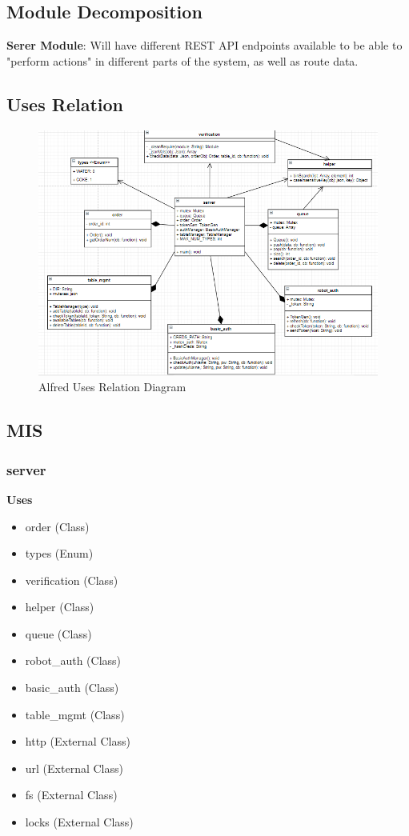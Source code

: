 \documentclass [10pt]{article}
\begin{document}
\subsection{Module Decomposition}
\textbf{Serer Module}: Will have different REST API endpoints available to be able to "perform actions" in different parts of the system, as well as route data.

\subsection{Uses Relation}
\begin{figure} [h!]
	\centering
	\includegraphics [scale = 0.4] {figures/server_class_diagram.PNG}
	\caption{Alfred Uses Relation Diagram}
\end{figure}

\subsection{MIS}
\subsubsection{server}
\textbf{Uses}
\begin{itemize}
	\item order (Class)
	\item types (Enum)
	\item verification (Class)
	\item helper (Class)
	\item queue (Class)
	\item robot\_auth (Class)
	\item basic\_auth (Class)
	\item table\_mgmt (Class)
	\item http (External Class)
	\item url (External Class)
	\item fs (External Class)
	\item locks (External Class)
\end{itemize}
\end{document}
